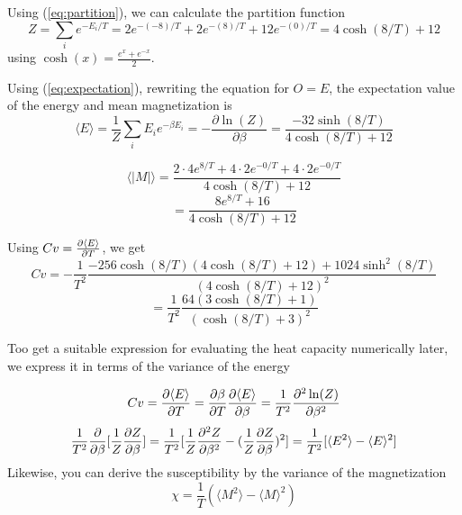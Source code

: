 Using (\ref{eq:partition}), we can calculate the partition function 
\begin{equation}\label{eq:partition2x2}
    Z = \sum_i e^{-E_i/T} = 2e^{-(-8)/T} + 2e^{-(8)/T} + 12e^{-(0)/T} = 4\cosh(8/T) + 12
\end{equation}
using $\cosh(x) = \frac{e^{x} + e^{-x}}{2}$.

Using (\ref{eq:expectation}), rewriting the equation for $O = E$, the expectation value of the energy and mean magnetization is
\begin{equation}\label{eq:expectE}
    \langle E \rangle = \frac{1}{Z}\sum_i E_i e^{-\beta E_i} = -\frac{\partial \ln(Z)}{\partial \beta}
    = \frac{-32\sinh(8/T)}{4\cosh(8/T) + 12}
\end{equation}

\begin{equation}\label{eq:expectM}
    \langle |M| \rangle = \frac{2\cdot4e^{8/T} + 4\cdot2e^{-0/T} + 4\cdot2e^{-0/T}}
    {4\cosh(8/T) + 12}
\end{equation}
\begin{equation*}
    =\frac{8e^{8/T} + 16}{4\cosh(8/T) + 12}
\end{equation*}

Using $Cv = \pdv{\langle E \rangle}{T}$, we get
\begin{equation}\label{eq:heatcap}
    Cv = -\frac{1}{T^2}\frac{-256\cosh(8/T)(4\cosh(8/T)+12)+1024\sinh^2(8/T)}{(4\cosh(8/T) + 12)^2}
\end{equation}
\begin{equation*}
    = \frac{1}{T^2}\frac{64(3\cosh(8/T) + 1)}{(\cosh(8/T) + 3)^2}
\end{equation*}

Too get a suitable expression for evaluating the heat capacity numerically later, we express it in terms of the variance of the energy

\begin{equation*}
    Cv = \pdv{\langle E \rangle}{T} = \pdv{\beta}{T}\pdv{\langle E \rangle}{\beta}
    = \frac{1}{T^2}\pdv{^2\ln(Z)}{\beta^2}
\end{equation*}
\begin{equation*}
    \frac{1}{T^2}\pdv{}{\beta}[\frac{1}{Z}\pdv{Z}{\beta}] = 
    \frac{1}{T^2}[\frac{1}{Z}\pdv{^2Z}{\beta^2} - (\frac{1}{Z}\pdv{Z}{\beta})^2]
    = \frac{1}{T^2}[\langle E^2 \rangle - \langle E \rangle^2]
\end{equation*}
Likewise, you can derive the susceptibility by the variance of the magnetization
\begin{equation*}
    \chi = \frac{1}{T}(\langle M^2 \rangle - \langle M \rangle^2)
\end{equation*}






